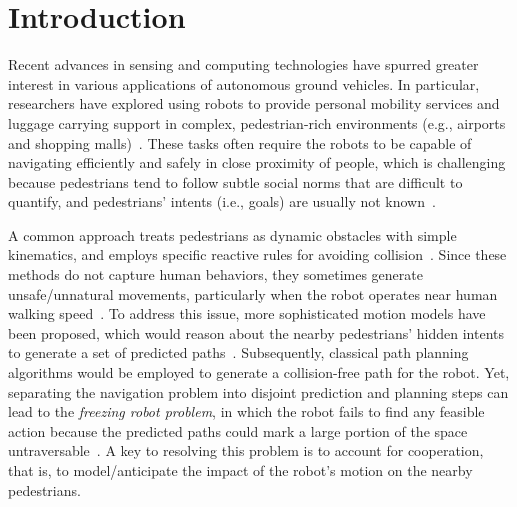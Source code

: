\section{Introduction} \label{sec:intro}


Recent advances in sensing and computing technologies have spurred greater interest in various applications of autonomous ground vehicles. In particular, researchers have explored using robots to provide personal mobility services and luggage carrying support in complex, pedestrian-rich environments (e.g., airports and shopping malls)~\cite{bai_intention-aware_2015}. These tasks often require the robots to be capable of navigating efficiently and safely in close proximity of people, which is challenging because pedestrians tend to follow subtle social norms that are difficult to quantify, and pedestrians' intents (i.e., goals) are usually not known~\cite{kretzschmar_socially_2016}.

A common approach treats pedestrians as dynamic obstacles with simple kinematics, and employs specific reactive rules for avoiding collision~\cite{fox_dynamic_1997,van_den_berg_reciprocal_2008,phillips_sipp:_2011,berg_reciprocal_2011}. Since these methods do not capture human behaviors, they sometimes generate unsafe/unnatural movements, particularly when the robot operates near human walking speed~\cite{kretzschmar_socially_2016}. To address this issue, more sophisticated motion models have been proposed, which would reason about the nearby pedestrians' hidden intents to generate a set of predicted paths~\cite{kim_brvo:_2015,unhelkar_human-robot_2015}. Subsequently, classical path planning algorithms would be employed to generate a collision-free path for the robot. Yet, separating the navigation problem into disjoint prediction and planning steps can lead to the \emph{freezing robot problem}, in which the robot fails to find any feasible action because the predicted paths could mark a large portion of the space untraversable~\cite{trautman_robot_2015}.
A key to resolving this problem is to account for cooperation, that is, to model/anticipate the impact of the robot's motion on the nearby pedestrians. 

